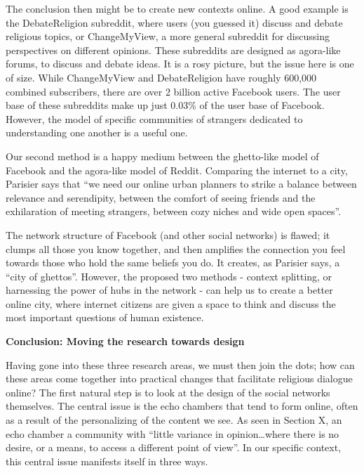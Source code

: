 \documentclass[]{article}
\begin{document}
The conclusion then might be to create new contexts online. A good
example is the DebateReligion subreddit\autocite{DebateReligion}, where
users (you guessed it) discuss and debate religious topics, or
ChangeMyView\autocite{ChangeMyView}, a more general subreddit for
discussing perspectives on different opinions. These subreddits are
designed as agora-like forums, to discuss and debate ideas. It is a rosy
picture, but the issue here is one of size. While ChangeMyView and
DebateReligion have roughly 600,000 combined subscribers, there are over
2 billion active Facebook
users\autocite{StatistaFacebookUsersWorldwide}. The user base of these
subreddits make up just 0.03\% of the user base of Facebook. However,
the model of specific communities of strangers dedicated to
understanding one another is a useful one.

Our second method is a happy medium between the ghetto-like model of
Facebook and the agora-like model of Reddit. Comparing the internet to a
city, Parisier says that ``we need our online urban planners to strike a
balance between relevance and serendipity, between the comfort of seeing
friends and the exhilaration of meeting strangers, between cozy niches
and wide open spaces''\autocite[pg 222]{PariserFilterBubblewhat2012}.

The network structure of Facebook (and other social networks) is flawed;
it clumps all those you know together, and then amplifies the connection
you feel towards those who hold the same beliefs you do. It creates, as
Parisier says, a ``city of
ghettos''\autocite[pg 222]{PariserFilterBubblewhat2012}. However, the
proposed two methods - context splitting, or harnessing the power of
hubs in the network - can help us to create a better online city, where
internet citizens are given a space to think and discuss the most
important questions of human existence.

\newpage 

\textbf{Conclusion: Moving the research towards design}

Having gone into these three research areas, we must then join the dots;
how can these areas come together into practical changes that facilitate
religious dialogue online? The first natural step is to look at the
design of the social networks themselves. The central issue is the echo
chambers that tend to form online, often as a result of the
personalizing of the content we see. As seen in Section X, an echo
chamber a community with ``little variance in opinion\ldots{}where there
is no desire, or a means, to access a different point of
view''\autocite{Thwaitenewtheoryecho2018}. In our specific context, this
central issue manifests itself in three ways.
\end{document}
